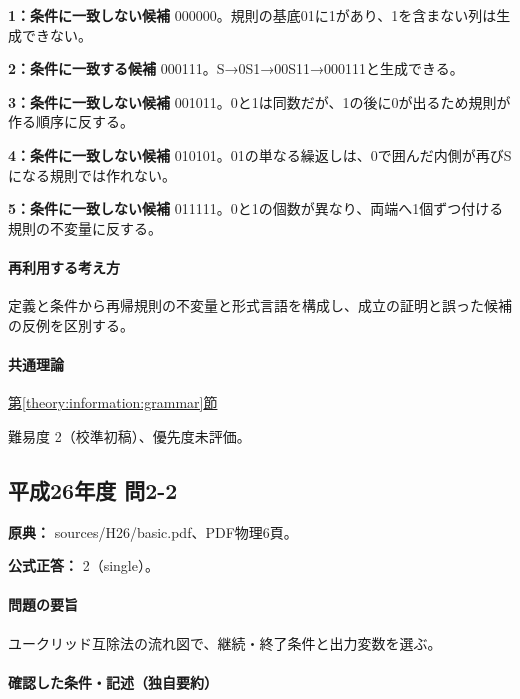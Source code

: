 \noindent\textbf{1：条件に一致しない候補} 000000。規則の基底01に1があり、1を含まない列は生成できない。\par

\noindent\textbf{2：条件に一致する候補} 000111。S→0S1→00S11→000111と生成できる。\par

\noindent\textbf{3：条件に一致しない候補} 001011。0と1は同数だが、1の後に0が出るため規則が作る順序に反する。\par

\noindent\textbf{4：条件に一致しない候補} 010101。01の単なる繰返しは、0で囲んだ内側が再びSになる規則では作れない。\par

\noindent\textbf{5：条件に一致しない候補} 011111。0と1の個数が異なり、両端へ1個ずつ付ける規則の不変量に反する。\par

\paragraph{再利用する考え方} 定義と条件から再帰規則の不変量と形式言語を構成し、成立の証明と誤った候補の反例を区別する。

\paragraph{共通理論} \hyperref[theory:information:grammar]{第\ref*{theory:information:grammar}節}

\par 難易度 2（校準初稿）、優先度未評価。

\subsection{平成26年度 問2-2}
\label{q:h26-reg-basic-2-2}

\noindent\textbf{原典：} sources/H26/basic.pdf、PDF物理6頁。

\textbf{公式正答：} 2（single）。

\paragraph{問題の要旨} ユークリッド互除法の流れ図で、継続・終了条件と出力変数を選ぶ。

\paragraph{確認した条件・記述（独自要約）}\mbox{}\par

